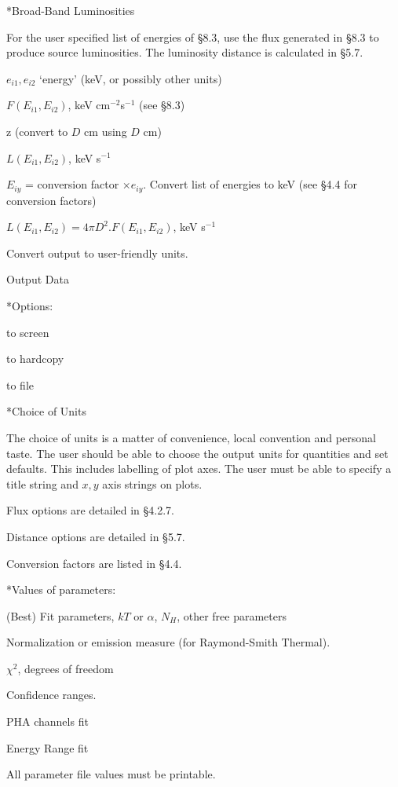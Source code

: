 \**Broad-Band Luminosities
 
{\list


For the user specified list of energies of \S8.3, use the flux generated in
\S8.3 to produce source luminosities.  The luminosity distance is
calculated in \S5.7.

 
$e_{i1}, e_{i2}$ `energy' (keV, or possibly other units)
 
$F(E_{i1},E_{i2})$, keV cm$^{-2}$s$^{-1}$ (see \S 8.3)

z (convert to $D$ cm using %
$D$ cm)

 
$L(E_{i1},E_{i2})$,  keV s$^{-1}$
 
 
$E_{iy}$ = conversion factor $\times e_{iy}$. Convert list of energies to keV
(see \S4.4 for conversion factors)

$L(E_{i1},E_{i2}) = 4\pi D^{2}.F(E_{i1},E_{i2})$, keV s$^{-1}$

Convert output to user-friendly units.

}
 
\@{Output Data}
 
\**Options:

{\list

to screen

to hardcopy

to file
 
}
 
\**Choice of Units

{\list

The choice of units is a matter of convenience, local convention and
personal taste.  The user should be able to choose the output units for
quantities and set defaults.  This includes labelling of plot axes.
The user must be able to specify a title string and $x,y$ axis strings on
plots.

Flux options are detailed in \S4.2.7.

Distance options are detailed in \S5.7.

Conversion factors are listed in \S4.4.

}
 
\**Values of parameters:

{\list

(Best) Fit parameters, $kT$ or $\alpha$, $N_H$, other free parameters

Normalization or emission measure (for Raymond-Smith Thermal).

$\chi^{2}$, degrees of freedom

Confidence ranges.

PHA channels fit

Energy Range fit

All parameter file values must be printable.

}
 
